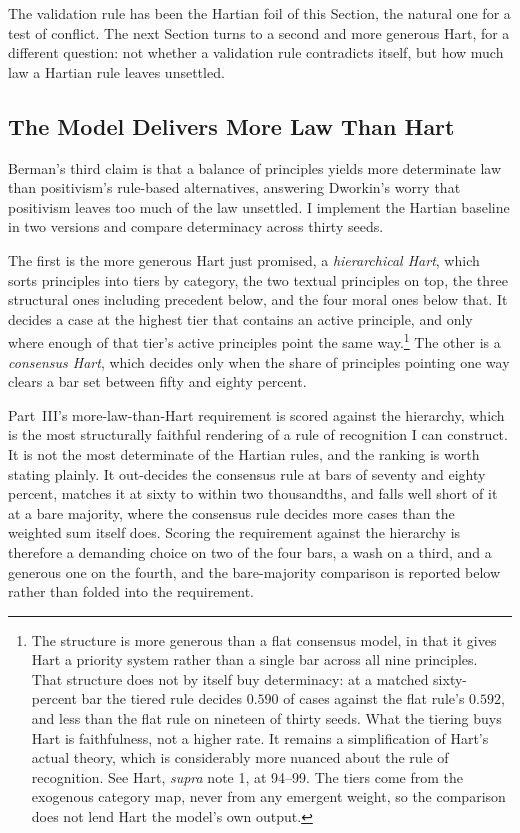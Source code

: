 The validation rule has been the Hartian foil of this Section, the natural one for
a test of conflict. The next Section turns to a second and more generous
Hart, for a different question: not whether a validation rule contradicts
itself, but how much law a Hartian rule leaves unsettled.

\subsection{The Model Delivers More Law Than Hart}

Berman's third claim is that a balance of principles yields more determinate
law than positivism's rule-based alternatives, answering Dworkin's worry that
positivism leaves too much of the law unsettled. I implement the Hartian
baseline in two versions and compare determinacy across thirty seeds.

The first is the more generous Hart just promised, a \textit{hierarchical Hart},
which sorts principles
into tiers by category, the two textual principles on top, the three
structural ones including precedent below, and the four moral ones below
that. It decides a case at the highest tier that contains an active principle,
and only where enough of that tier's active principles point the same way.\footnote{The
structure is more generous than a flat consensus model, in that it gives Hart
a priority system rather than a single bar across all nine principles. That
structure does not by itself buy determinacy: at a matched sixty-percent bar
the tiered rule decides $0.590$ of cases against the flat rule's $0.592$, and
less than the flat rule on nineteen of thirty seeds. What the tiering buys
Hart is faithfulness, not a higher rate. It remains a simplification of Hart's actual theory, which is
considerably more nuanced about the rule of recognition. See Hart,
\textit{supra} note 1, at 94--99. The tiers come from the exogenous category
map, never from any emergent weight, so the comparison does not lend Hart the
model's own output.} The other is a \textit{consensus Hart}, which decides
only when the share of principles pointing one way clears a bar set between
fifty and eighty percent.

Part~III's more-law-than-Hart requirement is scored against the hierarchy, which is the most
structurally faithful rendering of a rule of recognition I can construct. It
is not the most determinate of the Hartian rules, and the ranking is worth
stating plainly. It out-decides the consensus rule at bars of seventy and
eighty percent, matches it at sixty to within two thousandths, and falls well
short of it at a bare majority, where the consensus rule decides more cases
than the weighted sum itself does. Scoring the requirement against the
hierarchy is therefore a demanding choice on two of the four bars, a wash on a
third, and a
generous one on the fourth, and the bare-majority comparison is reported below
rather than folded into the requirement.

